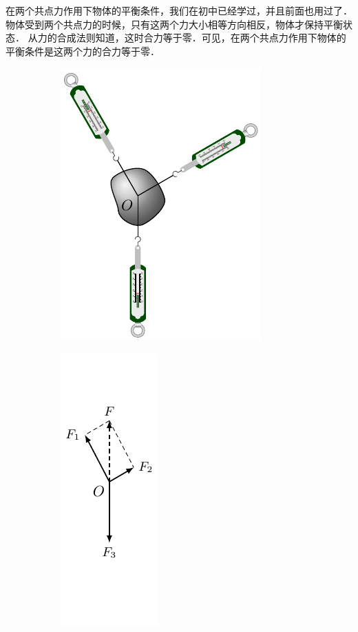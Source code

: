 在两个共点力作用下物体的平衡条件，我们在初中已经学过，并且前面也用过了．
物体受到两个共点力的时候，只有这两个力大小相等方向相反，物体才保持平衡状态．
从力的合成法则知道，这时合力等于零．可见，在两个共点力作用下物体的平衡条件是这两个力的合力等于零．
\begin{figure}[htbp]
    \centering
    \begin{subfigure} {0.4\linewidth} 
        \centering
        \includegraphics{fig/A/6-1a.pdf} 
        \caption{}\label{fig_A_6-1a} 
    \end{subfigure}
    \hfil
    \begin{subfigure} {0.4\linewidth} 
        \centering
        \includegraphics{fig/A/6-1b.pdf} 
        \caption{}\label{fig_A_6-1b} 
    \end{subfigure}
    \caption{}\label{fig_A_6-1}
\end{figure}


